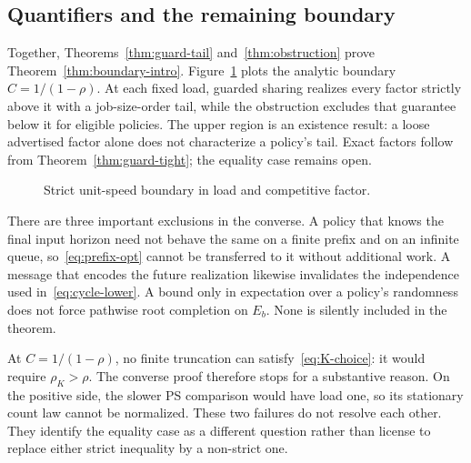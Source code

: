 \subsection{Quantifiers and the remaining boundary}
Together, Theorems~\ref{thm:guard-tail} and~\ref{thm:obstruction} prove Theorem~\ref{thm:boundary-intro}. Figure~\ref{fig:phase} plots the analytic boundary $C=1/(1-\rho)$. At each fixed load, guarded sharing realizes every factor strictly above it with a job-size-order tail, while the obstruction excludes that guarantee below it for eligible policies. The upper region is an existence result: a loose advertised factor alone does not characterize a policy's tail. Exact factors follow from Theorem~\ref{thm:guard-tight}; the equality case remains open.

\begin{figure}[t]
\centering

\caption{Strict unit-speed boundary in load and competitive factor.}\label{fig:phase}
\end{figure}

There are three important exclusions in the converse. A policy that knows the final input horizon need not behave the same on a finite prefix and on an infinite queue, so~\eqref{eq:prefix-opt} cannot be transferred to it without additional work. A message that encodes the future realization likewise invalidates the independence used in~\eqref{eq:cycle-lower}. A bound only in expectation over a policy's randomness does not force pathwise root completion on $E_b$. None is silently included in the theorem.

At $C=1/(1-\rho)$, no finite truncation can satisfy~\eqref{eq:K-choice}: it would require $\rho_K>\rho$. The converse proof therefore stops for a substantive reason. On the positive side, the slower PS comparison would have load one, so its stationary count law cannot be normalized. These two failures do not resolve each other. They identify the equality case as a different question rather than license to replace either strict inequality by a non-strict one.
